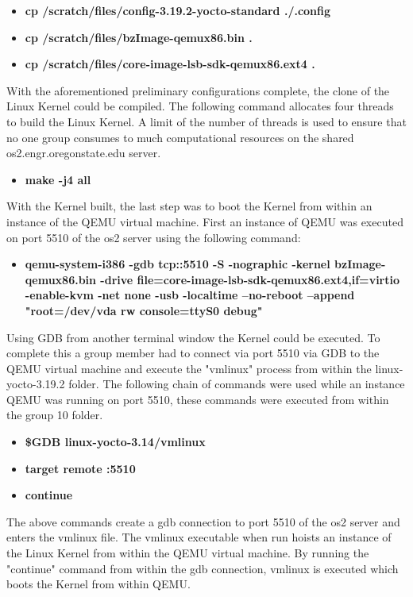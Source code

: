 \documentclass[10pt,onecolumn,draftclsnofoot]{IEEEtran} %
\begin{document}
\begin{singlespace}
\hfill\break
  \begin{itemize}
    \item \textbf{cp /scratch/files/config-3.19.2-yocto-standard ./.config}
    \item \textbf{cp /scratch/files/bzImage-qemux86.bin .}
    \item \textbf{cp /scratch/files/core-image-lsb-sdk-qemux86.ext4 .}
  \end{itemize}
\hfill\break
  \normalfont \indent With the aforementioned preliminary configurations complete, the clone of the Linux Kernel could be compiled. The following command allocates four threads to build the Linux Kernel. A limit of the number of threads is used to ensure that no one group consumes to much computational resources on the shared os2.engr.oregonstate.edu server.
\hfill\break
  \begin{itemize}
    \item \textbf{make -j4 all}
  \end{itemize}
\hfill\break
  \normalfont \indent With the Kernel built, the last step was to boot the Kernel from within an instance of the QEMU virtual machine. First an instance of QEMU was executed on port 5510 of the os2 server using the following command:
\hfill\break
  \begin{itemize}
    \item \textbf{qemu-system-i386 -gdb tcp::5510 -S -nographic -kernel bzImage-qemux86.bin -drive file=core-image-lsb-sdk-qemux86.ext4,if=virtio -enable-kvm -net none -usb -localtime --no-reboot --append "root=/dev/vda rw console=ttyS0 debug"}
  \end{itemize}
\hfill\break
  \normalfont \indent Using GDB from another terminal window the Kernel could be executed. To complete this a group member had to connect via port 5510 via GDB to the QEMU virtual machine and execute the "vmlinux" process from within the linux-yocto-3.19.2 folder. The following chain of commands were used while an instance QEMU was running on port 5510, these commands were executed from within the group 10 folder.

  \hfill\break
  \begin{itemize}
    \item \textbf{\$GDB linux-yocto-3.14/vmlinux}
    \item \textbf{target remote :5510}
    \item \textbf{continue}
  \end{itemize}
\hfill\break

  \normalfont \indent The above commands create a gdb connection to port 5510 of the os2 server and enters the vmlinux file. The vmlinux executable when run hoists an instance of the Linux Kernel from within the QEMU virtual machine. By running the "continue" command from within the gdb connection, vmlinux is executed which boots the Kernel from within QEMU.



\end{singlespace}
\end{document}
